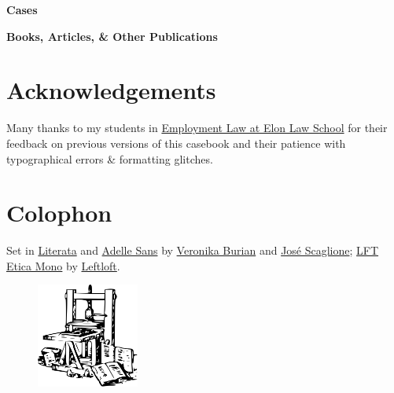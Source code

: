 \documentclass[
  letterpaper,
  11pt,
  DIV=9,
  openright]{scrbook}
\begin{document}
{\bfseries\Large{Cases}}

\vspace{2em}

{\bfseries\Large{Books, Articles, \& Other Publications}}



\chapter*{Acknowledgements}

Many thanks to my students in \href{https://www.emfink.net/EmploymentLaw/}{Employment Law at Elon Law School} for their feedback on previous versions of this casebook and their patience with typographical errors \& formatting glitches. 

\chapter*{Colophon}

\raggedright{Set in \href{https://www.type-together.com/literata-font/}{Literata} and \href{https://www.type-together.com/adelle-sans-font/}{Adelle Sans} by \href{https://www.type-together.com/veronika-burian/}{Veronika Burian} and \href{https://www.type-together.com/jose-scaglione/}{José Scaglione}; \href{https://www.type-together.com/lft-etica-mono-font/}{LFT Etica Mono} by \href{https://www.type-together.com/leftloft/}{Leftloft}.}

\begin{figure}
\centering
\includegraphics[width=0.3\textwidth]{../img/gutenberg_press.png}
\end{figure}
\end{document}
